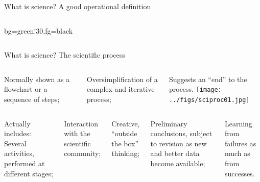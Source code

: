 \documentclass[t]{beamer}
\begin{document}
\begin{ftst}
{What is science?}
{A good operational definition}
\vone
\begin{columns}[T]
\begin{colorblock}{}{bg=green!30,fg=black}
\end{colorblock}
\end{columns}
\vhalf
{}
\end{ftst}


\begin{ftst}
{What is science?}
{The scientific process}
\begin{columns}[T]
		\bitems Normally shown as a flowchart or a sequence of steps;
			\item Oversimplification of a complex and iterative process;
			\item Suggests an ``end'' to the process.
		\eitem
	 \texttt{[image: ../figs/sciproc01.jpg]}
\end{columns}
\vone
\begin{columns}[T]
		\bitems Actually includes:
			\bitems Several activities, performed at different stages;
			\item Interaction with the scientific community;
			\item Creative, ``outside the box'' thinking;
			\item Preliminary conclusions, subject to revision as new and better data become available;
			\item Learning from failures as much as from successes.
		\eitem
	\eitem
\end{columns}
\end{ftst}
\end{document}
